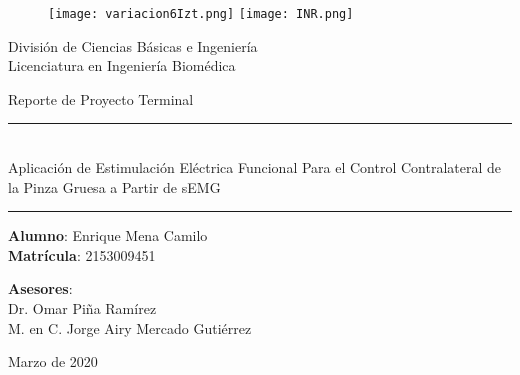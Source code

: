 \begin{titlepage}
\begin{center}

\begin{figure}
	\centering
	\texttt{[image: variacion6Izt.png]}
	\hfill
	\texttt{[image: INR.png]}
\end{figure}

\LARGE{División de Ciencias Básicas e Ingeniería\\Licenciatura en Ingeniería Biomédica\\}

\vspace*{\fill}
\LARGE{Reporte de Proyecto Terminal}

\vspace*{\fill}

\rule{15.5cm}{0.5mm}\\
\LARGE{Aplicación de Estimulación Eléctrica Funcional Para el Control Contralateral de la Pinza Gruesa a Partir de sEMG}\\
\rule{15.5cm}{0.5mm}

\vspace*{\fill}

\LARGE{	\textbf{Alumno}: Enrique Mena Camilo\\
		\textbf{Matrícula}: 2153009451\\}

\vspace*{\fill}

\LARGE{\textbf{Asesores}:\\Dr. Omar Piña Ramírez\\M. en C. Jorge Airy Mercado Gutiérrez}

\vspace*{\fill}

\Large{Marzo de 2020}

\end{center}
\end{titlepage}